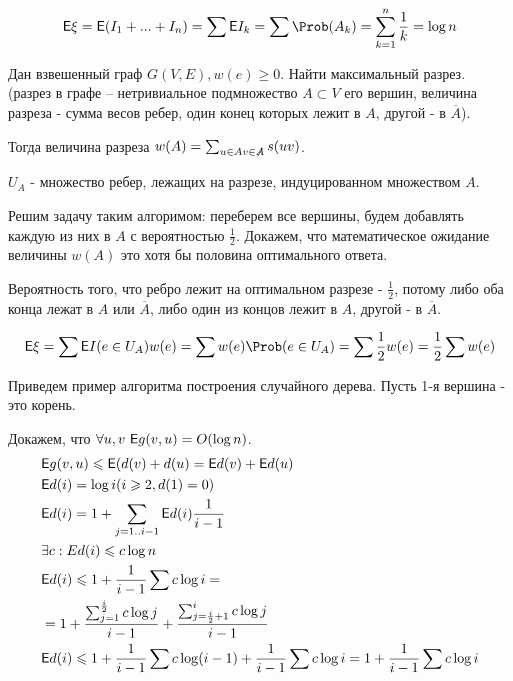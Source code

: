 \[
    \E\xi = \E(I_1 +...+ I_n) = \sum \E I_k = \sum \P(A_k) = \sum_{k=1}^{n} \frac{1}{k} = \log n
\]

\begin{example}
    Дан взвешенный граф $G(V,E), w(e) \geq 0$. Найти максимальный разрез. (разрез в графе -- нетривиальное подмножество $A \subset V$ его вершин, величина разреза - сумма весов ребер, один конец которых лежит в $A$, другой - в $\overline{A}$). \par
    
    Тогда величина разреза $w(A)=\sum_{u \in A \\ v \in \not{A}} s(uv)$. \par

    $U_A$ - множество ребер, лежащих на разрезе, индуцированном множеством $A$. \par
    
    Решим задачу таким алгоримом: переберем все вершины, будем добавлять каждую из них в $A$ с
    вероятностью $\frac{1}{2}$. Докажем, что математическое ожидание величины $w(A)$ это хотя бы половина оптимального ответа. \par
    
    Вероятность того, что ребро лежит на оптимальном разрезе - $\frac{1}{2}$, потому либо оба конца лежат в $A$ или $\overline{A}$, либо один из концов лежит в $A$, другой - в $\overline{A}$. \par
    \[
        \E\xi = \sum \E I(e \in U_A)w(e) = \sum w(e)\P(e \in U_A) = \sum \frac{1}{2} w(e) = \frac{1}{2} \sum w(e)
    \]
\end{example}

\begin{example}
    Приведем пример алгоритма построения случайного дерева. Пусть 1-я вершина - это корень. \par

\rm{
  \begin{algorithm}
    \begin{algorithmic}
        \EndIf
      \EndFor
    \end{algorithmic}
  \end{algorithm}
}
    Докажем, что $\forall u,v \ \mathsf{E} g(v,u)=O(\log n)$.
    \begin{align*}
        & \mathsf{E} g(v,u) \leqslant \mathsf{E}(d(v) + d(u) = \mathsf{E} d(v) + \mathsf{E} d(u) \\
        & \mathsf{E} d(i)=\log i (i \geqslant{2},d(1)=0) \\
        & \mathsf{E} d(i)=1+\sum_{j=1..i-1} \mathsf{E} d(i) \frac{1}{i-1} \\
        & \exists c: Ed(i) \leqslant{c \log n} \\
        & \mathsf{E} d(i) \leqslant{ 1+ \frac{1}{i-1} \sum c \log i} = \\
        & = 1 + \frac{\sum_{j=1}^{\frac{i}{2}} c \log j}{i-1} + \frac{\sum_{j=\frac{i}{2}+1}^{i} c \log j}{i-1} \\
        & \mathsf{E} d(i) \leqslant{1+\frac{1}{i-1} \sum c\log (i-1) + \frac{1}{i-1} \sum c\log i} = 1 + \frac{1}{i-1} \sum c\log i
    \end{align*}
\end{example}